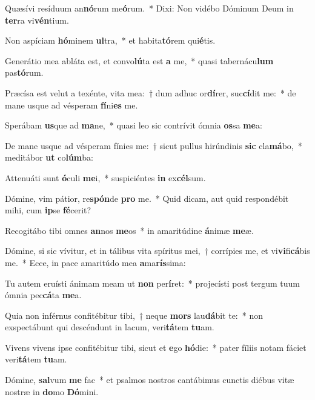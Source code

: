 \item Quæsívi resíduum an\textbf{nó}rum me\textbf{ó}rum.~* Dixi: Non vidébo Dóminum Deum in \textbf{ter}ra vi\textbf{vén}tium.
\item Non aspíciam \textbf{hó}minem \textbf{ul}tra,~* et habita\textbf{tó}rem qui\textbf{é}tis.
\item Generátio mea abláta est, et convo\textbf{lú}ta est \textbf{a} me,~* quasi tabernácu\textbf{lum} pas\textbf{tó}rum.
\item Præcísa est velut a texénte, vita mea:~† dum adhuc or\textbf{dí}rer, suc\textbf{cí}dit me:~* de mane usque ad vésperam \textbf{fí}ni\textbf{es} me.
\item Sperábam \textbf{us}que ad \textbf{ma}ne,~* quasi leo sic contrívit ómnia \textbf{os}sa \textbf{me}a:
\item De mane usque ad vésperam fínies me:~† sicut pullus hirúndinis \textbf{sic} cla\textbf{má}bo,~* meditábor \textbf{ut} co\textbf{lúm}ba:
\item Attenuáti sunt \textbf{ó}culi \textbf{me}i,~* suspiciéntes \textbf{in} ex\textbf{cél}sum.
\item Dómine, vim pátior, re\textbf{spón}de \textbf{pro} me.~* Quid dicam, aut quid respondébit mihi, cum \textbf{ip}se \textbf{fé}cerit?
\item Recogitábo tibi omnes \textbf{an}nos \textbf{me}os~* in amaritúdine \textbf{á}nimæ \textbf{me}æ.
\item Dómine, si sic vívitur, et in tálibus vita spíritus mei,~† corrípies me, et vi\textbf{vi}fi\textbf{cá}bis me.~* Ecce, in pace amaritúdo mea \textbf{a}ma\textbf{rís}sima:
\item Tu autem eruísti ánimam meam ut \textbf{non} per\textbf{í}ret:~* projecísti post tergum tuum ómnia pec\textbf{cá}ta \textbf{me}a.
\item Quia non inférnus confitébitur tibi,~† neque \textbf{mors} lau\textbf{dá}bit te:~* non exspectábunt qui descéndunt in lacum, veri\textbf{tá}tem \textbf{tu}am.
\item Vivens vivens ipse confitébitur tibi, sicut et \textbf{e}go \textbf{hó}die:~* pater fíliis notam fáciet veri\textbf{tá}tem \textbf{tu}am.
\item Dómine, \textbf{sal}vum \textbf{me} fac~* et psalmos nostros cantábimus cunctis diébus vitæ nostræ in \textbf{do}mo \textbf{Dó}mini.
